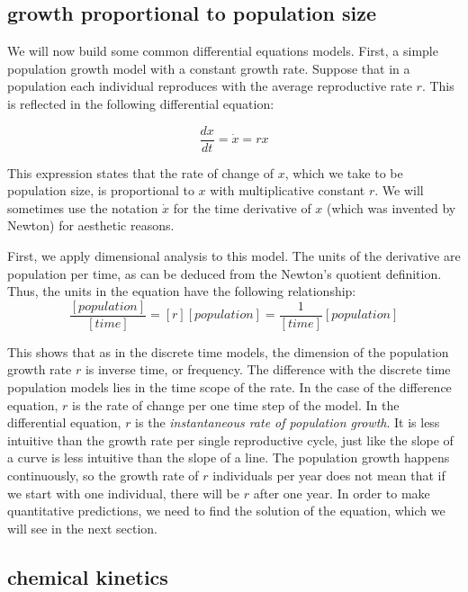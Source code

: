 \documentclass[
  letterpaper,
  DIV=11,
  numbers=noendperiod]{scrreprt}
\begin{document}
\hypertarget{growth-proportional-to-population-size}{%
\subsection{growth proportional to population
size}\label{growth-proportional-to-population-size}}

We will now build some common differential equations models. First, a
simple population growth model with a constant growth rate. Suppose that
in a population each individual reproduces with the average reproductive
rate \(r\). This is reflected in the following differential equation:

\begin{equation}
\frac{d x} {dt} = \dot x = r x
\label{eq:linear_ode}
 \end{equation}

This expression states that the rate of change of \(x\), which we take
to be population size, is proportional to \(x\) with multiplicative
constant \(r\). We will sometimes use the notation \(\dot x\) for the
time derivative of \(x\) (which was invented by Newton) for aesthetic
reasons.

First, we apply  dimensional analysis to
this model. The units of the derivative are population per time, as can
be deduced from the Newton's quotient definition. Thus, the units in the
equation have the following relationship: \[ 
\frac{[population]}{[time]} = [r] [population] = \frac{1}{[time]}[population] 
\]

This shows that as in the discrete time models, the dimension of the
population growth rate \(r\) is inverse time, or frequency. The
difference with the discrete time population models lies in the time
scope of the rate. In the case of the difference equation, \(r\) is the
rate of change per one time step of the model. In the differential
equation, \(r\) is the \emph{instantaneous rate of population growth}.
It is less intuitive than the growth rate per single reproductive cycle,
just like the slope of a curve is less intuitive than the slope of a
line. The population growth happens continuously, so the growth rate of
\(r\) individuals per year does not mean that if we start with one
individual, there will be \(r\) after one year. In order to make
quantitative predictions, we need to find the solution of the equation,
which we will see in the next section.

\hypertarget{chemical-kinetics}{%
\subsection{chemical kinetics}\label{chemical-kinetics}}
\end{document}
